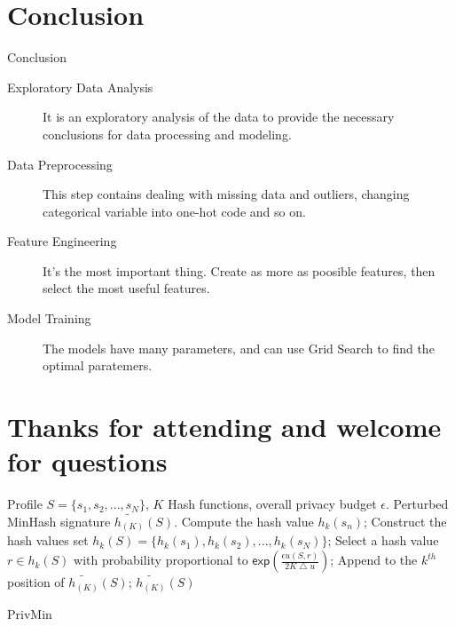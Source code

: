 \documentclass[
 size=14pt,
 paper=smartboard,  %
 mode=present, 		%
 display=slides, 	%
 style=tuliplab,  	%
 pauseslide,
 fleqn,leqno]{powerdot}
\begin{document}
\section{Conclusion}

\begin{slide}[toc=,bm=]{Conclusion}
\begin{description}
	\item[Exploratory Data Analysis] It is an 
	exploratory analysis of the data to 
	provide the necessary conclusions 
	for data processing and modeling.
	\item[Data Preprocessing] This step contains
	dealing with missing data and outliers,
	changing categorical variable 
	into one-hot code and so on.
	\item[Feature Engineering] It's the 
	most important thing.
	Create as more as poosible features,
	then select the most useful features.
	\item[Model Training] The models have 
	many parameters,
	and can use Grid Search to find 
	the optimal paratemers.	
\end{description}



\end{slide}


%

\section{Thanks for attending and welcome for questions}
\begin{slide}
	
	\begin{center}
		\begin{algorithm}[H]
			\small
			\begin{algorithmic}[1]
				\REQUIRE
				Profile $S=\{ s_1, s_2, ... , s_N \}$,
				$K$ Hash functions,
				overall privacy budget $\epsilon$.
				\ENSURE
				Perturbed MinHash signature $\widetilde{h_{(K)}}(S)$.
				\STATE  Compute the hash value $h_{k}(s_n)$;
				\ENDFOR
				\STATE  Construct the hash values set
				$h_{k}(S)=\{ h_{k}(s_1), h_{k}(s_2), ..., h_{k}(s_N) \}$;
				\STATE  Select a hash value $r \in h_{k}(S)$
				with probability proportional to
				$\textsf{exp}(\frac{\epsilon u(S,r)}{2K\bigtriangleup u})$;
				\STATE  Append to the $k^{th}$ position of $\widetilde{h_{(K)}}(S)$;
				\ENDFOR
				\RETURN $\widetilde{h_{(K)}}(S)$
			\end{algorithmic}
			\caption{PrivMin}
			\label{alg:private_minhash}
		\end{algorithm}
	\end{center}
\end{slide}
\end{document}
